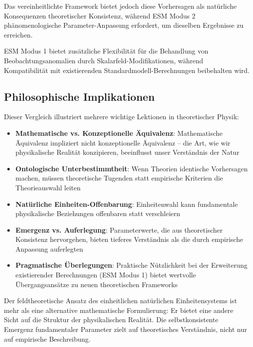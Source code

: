 	Das vereinheitlichte Framework bietet jedoch diese Vorhersagen als natürliche Konsequenzen theoretischer Konsistenz, während ESM Modus 2 phänomenologische Parameter-Anpassung erfordert, um dieselben Ergebnisse zu erreichen.
	
	ESM Modus 1 bietet zusätzliche Flexibilität für die Behandlung von Beobachtungsanomalien durch Skalarfeld-Modifikationen, während Kompatibilität mit existierenden Standardmodell-Berechnungen beibehalten wird.
	
	\subsection{Philosophische Implikationen}
	\label{subsec:philosophical_implications}
	
	Dieser Vergleich illustriert mehrere wichtige Lektionen in theoretischer Physik:
	
	\begin{itemize}
		\item \textbf{Mathematische vs. Konzeptionelle Äquivalenz}: Mathematische Äquivalenz impliziert nicht konzeptionelle Äquivalenz – die Art, wie wir physikalische Realität konzipieren, beeinflusst unser Verständnis der Natur
		\item \textbf{Ontologische Unterbestimmtheit}: Wenn Theorien identische Vorhersagen machen, müssen theoretische Tugenden statt empirische Kriterien die Theorieauswahl leiten
		\item \textbf{Natürliche Einheiten-Offenbarung}: Einheitenwahl kann fundamentale physikalische Beziehungen offenbaren statt verschleiern
		\item \textbf{Emergenz vs. Auferlegung}: Parameterwerte, die aus theoretischer Konsistenz hervorgehen, bieten tieferes Verständnis als die durch empirische Anpassung auferlegten
		\item \textbf{Pragmatische Überlegungen}: Praktische Nützlichkeit bei der Erweiterung existierender Berechnungen (ESM Modus 1) bietet wertvolle Übergangsansätze zu neuen theoretischen Frameworks
	\end{itemize}
	
	Der feldtheoretische Ansatz des einheitlichen natürlichen Einheitensystems ist mehr als eine alternative mathematische Formulierung: Er bietet eine andere Sicht auf die Struktur der physikalischen Realität. Die selbstkonsistente Emergenz fundamentaler Parameter zielt auf theoretisches Verständnis, nicht nur auf empirische Beschreibung.
	